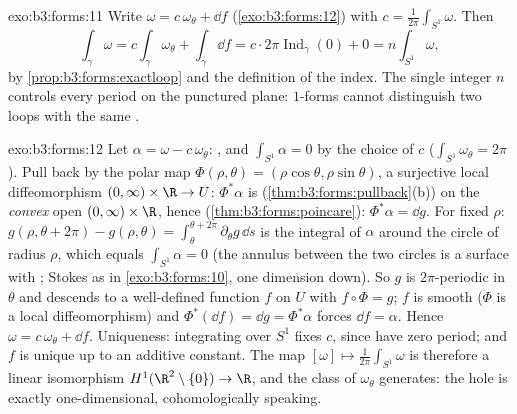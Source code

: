 \begin{solution}{exo:b3:forms:11}
Write $\omega = c\,\omega_\theta + \dd f$
(\cref{exo:b3:forms:12}) with $c =
\frac1{2\pi}\int_{S^1}\omega$. Then
\[
\int_\gamma\omega = c\int_\gamma\omega_\theta +
\int_\gamma\dd f
= c\cdot2\pi\operatorname{Ind}_\gamma(0) + 0
= n\int_{S^1}\omega,
\]
by \cref{prop:b3:forms:exactloop} and the definition of the
index. The single integer $n$ controls every period on the
punctured plane:  $1$-forms cannot distinguish two
loops with the same .
\end{solution}

\begin{solution}{exo:b3:forms:12}
Let $\alpha = \omega - c\,\omega_\theta$: , and
$\int_{S^1}\alpha = 0$ by the choice of $c$
($\int_{S^1}\omega_\theta = 2\pi$). Pull back by the polar
map $\Phi(\rho, \theta) = (\rho\cos\theta, \rho\sin\theta)$,
a surjective local diffeomorphism $(0, \infty)\times\R \to
U$: $\Phi^*\alpha$ is 
(\cref{thm:b3:forms:pullback}(b)) on the \emph{convex} open
$(0,\infty)\times\R$, hence 
(\cref{thm:b3:forms:poincare}): $\Phi^*\alpha = \dd g$.
For fixed $\rho$: $g(\rho, \theta + 2\pi) - g(\rho, \theta)
= \int_\theta^{\theta + 2\pi}\partial_\theta g\,\dd s$ is
the integral of $\alpha$ around the circle of radius
$\rho$, which equals $\int_{S^1}\alpha = 0$ (the annulus
between the two circles is a  surface with ;
Stokes as in \cref{exo:b3:forms:10}, one dimension down).
So $g$ is $2\pi$-periodic in $\theta$ and descends to a
well-defined function $f$ on $U$ with $f\circ\Phi = g$;
$f$ is smooth ($\Phi$ is a local diffeomorphism) and
$\Phi^*(\dd f) = \dd g = \Phi^*\alpha$ forces $\dd f =
\alpha$. Hence $\omega = c\,\omega_\theta + \dd f$.
Uniqueness: integrating over $S^1$ fixes $c$, since  have zero period; and $f$ is unique up to an additive
constant. The map $[\omega] \mapsto
\frac1{2\pi}\int_{S^1}\omega$ is therefore a linear
isomorphism $H^1(\R^2\setminus\{0\}) \to \R$, and the class
of $\omega_\theta$ generates: the hole is exactly
one-dimensional, cohomologically speaking.
\end{solution}


